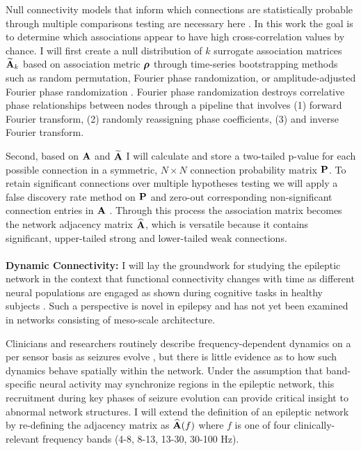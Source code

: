 Null connectivity models that inform which connections are statistically probable through multiple comparisons testing are necessary here \cite{bassett2013robust}. In this work the goal is to determine which associations appear to have high cross-correlation values by chance. I will first create a null distribution of $k$ surrogate association matrices $\widetilde{\mathbf{\displaystyle A}}_k$ based on association metric $\boldsymbol{\displaystyle \rho}$ through time-series bootstrapping methods such as random permutation, Fourier phase randomization, or amplitude-adjusted Fourier phase randomization \cite{bassett2013robust}. Fourier phase randomization destroys correlative phase relationships between nodes through a pipeline that involves (1) forward Fourier transform, (2) randomly reassigning phase coefficients, (3) and inverse Fourier transform.

Second, based on $\mathbf{\displaystyle A}$ and $\widetilde{\mathbf{\displaystyle A}}$ I will calculate and store a two-tailed p-value for each possible connection in a symmetric, $N \times N$ connection probability matrix $\mathbf{\displaystyle P}$. To retain significant connections over multiple hypotheses testing we will apply a false discovery rate method on $\mathbf{\displaystyle P}$ and zero-out corresponding non-significant connection entries in $\mathbf{\displaystyle A}$ \cite{benjamini2001control}. Through this process the association matrix becomes the network adjacency matrix $\widehat{\mathbf{\displaystyle A}}$, which is versatile because it contains significant, upper-tailed strong and lower-tailed weak connections.
~\\
~\\
\textbf{Dynamic Connectivity:}
I will lay the groundwork for studying the epileptic network in the context that functional connectivity changes with time as different neural populations are engaged as shown during cognitive tasks in healthy subjects \cite{bassett2011dynamic}. Such a perspective is novel in epilepsy and has not yet been examined in networks consisting of meso-scale architecture.

Clinicians and researchers routinely describe frequency-dependent dynamics on a per sensor basis as seizures evolve \cite{franaszczuk1998timefrequency, tzallas2009epileptic}, but there is little evidence as to how such dynamics behave spatially within the network. Under the assumption that band-specific neural activity may synchronize regions in the epileptic network, this recruitment during key phases of seizure evolution can provide critical insight to abnormal network structures. I will extend the definition of an epileptic network by re-defining the adjacency matrix as $\widehat{\mathbf{\displaystyle A}}(f)$ where $f$ is one of four clinically-relevant frequency bands (4-8, 8-13, 13-30, 30-100 Hz).

